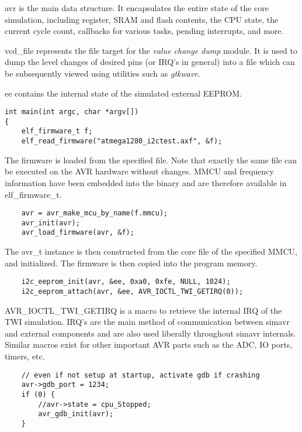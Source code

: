avr is the main data structure. It encapsulates the entire state of the
core simulation, including register, SRAM and flash contents, the CPU state, the
current cycle count, callbacks for various tasks, pending interrupts, and more.

vcd\_file represents the file target for the \emph{value change dump} module. It
is used to dump the level changes of desired pins (or IRQ's in general) into a
file which can be subsequently viewed using utilities such as \emph{gtkwave}.

ee contains the internal state of the simulated external EEPROM.

\begin{lstlisting}
int main(int argc, char *argv[])
{
    elf_firmware_t f;
    elf_read_firmware("atmega1280_i2ctest.axf", &f);
\end{lstlisting}

The firmware is loaded from the specified file. Note that exactly the same file
can be executed on the AVR hardware without changes. MMCU and frequency
information have been embedded into the binary and are therefore available in
elf\_firmware\_t.

\begin{lstlisting}
    avr = avr_make_mcu_by_name(f.mmcu);
    avr_init(avr);
    avr_load_firmware(avr, &f);
\end{lstlisting}

The avr\_t instance is then constructed from the core file of the specified
MMCU, and initialized. The firmware is then copied into the program memory.

\begin{lstlisting}
    i2c_eeprom_init(avr, &ee, 0xa0, 0xfe, NULL, 1024);
    i2c_eeprom_attach(avr, &ee, AVR_IOCTL_TWI_GETIRQ(0));
\end{lstlisting}

AVR\_IOCTL\_TWI\_GETIRQ is a macro to retrieve the internal IRQ of the TWI
simulation. IRQ's are the main method of communication between simavr and
external components and are also used liberally throughout simavr internals.
Similar macros exist for other important AVR parts such as the ADC, IO ports,
timers, etc.

\begin{lstlisting}
    // even if not setup at startup, activate gdb if crashing
    avr->gdb_port = 1234;
    if (0) {
        //avr->state = cpu_Stopped;
        avr_gdb_init(avr);
    }
\end{lstlisting}



